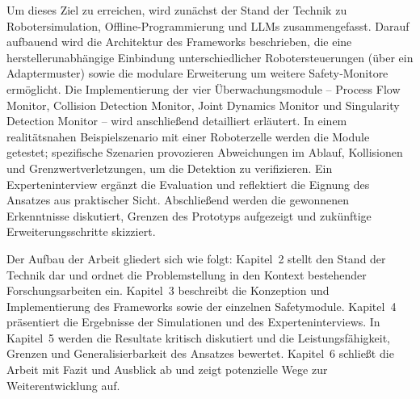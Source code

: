 Um dieses Ziel zu erreichen, wird zunächst der Stand der Technik zu
Robotersimulation, Offline‑Programmierung und LLMs zusammengefasst.
Darauf aufbauend wird die Architektur des Frameworks beschrieben, die
eine herstellerunabhängige Einbindung unterschiedlicher
Robotersteuerungen (über ein Adaptermuster) sowie die modulare
Erweiterung um weitere Safety‑Monitore ermöglicht. Die
Implementierung der vier Überwachungsmodule – Process Flow Monitor,
Collision Detection Monitor, Joint Dynamics Monitor und Singularity
Detection Monitor – wird anschließend detailliert erläutert. In einem
realitätsnahen Beispielszenario mit einer Roboterzelle werden die
Module getestet; spezifische Szenarien provozieren Abweichungen im
Ablauf, Kollisionen und Grenzwertverletzungen, um die Detektion zu
verifizieren. Ein Experteninterview ergänzt die Evaluation und
reflektiert die Eignung des Ansatzes aus praktischer Sicht.
Abschließend werden die gewonnenen Erkenntnisse diskutiert, Grenzen
des Prototyps aufgezeigt und zukünftige Erweiterungsschritte skizziert.

Der Aufbau der Arbeit gliedert sich wie folgt: Kapitel~2 stellt den
Stand der Technik dar und ordnet die Problemstellung in den Kontext
bestehender Forschungsarbeiten ein. Kapitel~3 beschreibt die
Konzeption und Implementierung des Frameworks sowie der einzelnen
Safetymodule. Kapitel~4 präsentiert die Ergebnisse der Simulationen
und des Experteninterviews. In Kapitel~5 werden die Resultate
kritisch diskutiert und die Leistungsfähigkeit, Grenzen und
Generalisierbarkeit des Ansatzes bewertet. Kapitel~6 schließt die
Arbeit mit Fazit und Ausblick ab und zeigt potenzielle Wege zur
Weiterentwicklung auf.
